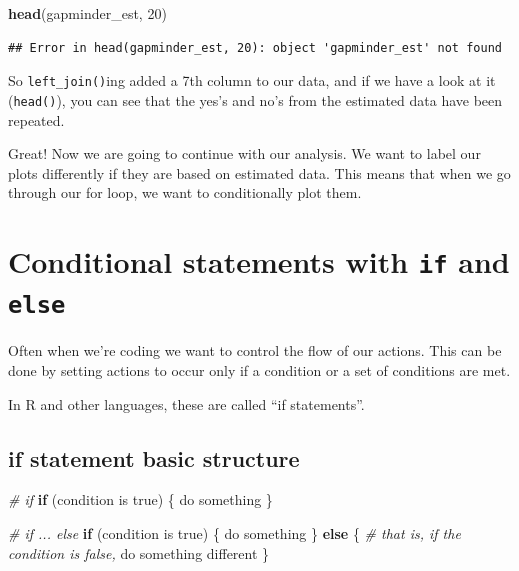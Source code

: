 \documentclass[]{book}
\newenvironment{Shaded}{\begin{snugshade}}{\end{snugshade}}
\newcommand{\KeywordTok}[1]{\textcolor[rgb]{0.13,0.29,0.53}{\textbf{#1}}}
\newcommand{\DecValTok}[1]{\textcolor[rgb]{0.00,0.00,0.81}{#1}}
\newcommand{\CommentTok}[1]{\textcolor[rgb]{0.56,0.35,0.01}{\textit{#1}}}
\newcommand{\ControlFlowTok}[1]{\textcolor[rgb]{0.13,0.29,0.53}{\textbf{#1}}}
\newcommand{\NormalTok}[1]{#1}
\theoremstyle{definition}
\theoremstyle{definition}
\theoremstyle{definition}
\theoremstyle{remark}
\begin{document}
\begin{Shaded}
\begin{Highlighting}[]
\KeywordTok{head}\NormalTok{(gapminder_est, }\DecValTok{20}\NormalTok{)}
\end{Highlighting}
\end{Shaded}

\begin{verbatim}
## Error in head(gapminder_est, 20): object 'gapminder_est' not found
\end{verbatim}

So \texttt{left\_join()}ing added a 7th column to our data, and if we
have a look at it (\texttt{head()}), you can see that the yes's and no's
from the estimated data have been repeated.

Great! Now we are going to continue with our analysis. We want to label
our plots differently if they are based on estimated data. This means
that when we go through our for loop, we want to conditionally plot
them.

\section{\texorpdfstring{Conditional statements with \texttt{if} and
\texttt{else}}{Conditional statements with if and else}}\label{conditional-statements-with-if-and-else}

Often when we're coding we want to control the flow of our actions. This
can be done by setting actions to occur only if a condition or a set of
conditions are met.

In R and other languages, these are called ``if statements''.

\subsection{if statement basic
structure}\label{if-statement-basic-structure}

\begin{Shaded}
\begin{Highlighting}[]
\CommentTok{# if}
\ControlFlowTok{if}\NormalTok{ (condition is true) \{}
\NormalTok{  do something}
\NormalTok{\}}

\CommentTok{# if ... else}
\ControlFlowTok{if}\NormalTok{ (condition is true) \{}
\NormalTok{  do something}
\NormalTok{\} }\ControlFlowTok{else}\NormalTok{ \{  }\CommentTok{# that is, if the condition is false,}
\NormalTok{  do something different}
\NormalTok{\}}
\end{Highlighting}
\end{Shaded}
\end{document}
